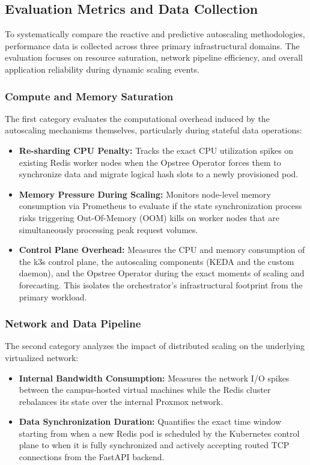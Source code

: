 \subsection{Evaluation Metrics and Data Collection}
\label{subsec:evaluation-metrics-and-data-collection}

To systematically compare the reactive and predictive autoscaling methodologies, performance data is collected across three primary infrastructural domains. The evaluation focuses on resource saturation, network pipeline efficiency, and overall application reliability during dynamic scaling events.

\subsubsection{Compute and Memory Saturation}
The first category evaluates the computational overhead induced by the autoscaling mechanisms themselves, particularly during stateful data operations:
\begin{itemize}
    \item \textbf{Re-sharding CPU Penalty:} Tracks the exact CPU utilization spikes on existing Redis worker nodes when the Opstree Operator forces them to synchronize data and migrate logical hash slots to a newly provisioned pod.
    \item \textbf{Memory Pressure During Scaling:} Monitors node-level memory consumption via Prometheus to evaluate if the state synchronization process risks triggering Out-Of-Memory (OOM) kills on worker nodes that are simultaneously processing peak request volumes.
    \item \textbf{Control Plane Overhead:} Measures the CPU and memory consumption of the k3s control plane, the autoscaling components (KEDA and the custom daemon), and the Opstree Operator during the exact moments of scaling and forecasting. This isolates the orchestrator's infrastructural footprint from the primary workload.
\end{itemize}

\subsubsection{Network and Data Pipeline}
The second category analyzes the impact of distributed scaling on the underlying virtualized network:
\begin{itemize}
    \item \textbf{Internal Bandwidth Consumption:} Measures the network I/O spikes between the campus-hosted virtual machines while the Redis cluster rebalances its state over the internal Proxmox network.
    \item \textbf{Data Synchronization Duration:} Quantifies the exact time window starting from when a new Redis pod is scheduled by the Kubernetes control plane to when it is fully synchronized and actively accepting routed TCP connections from the FastAPI backend.
\end{itemize}


